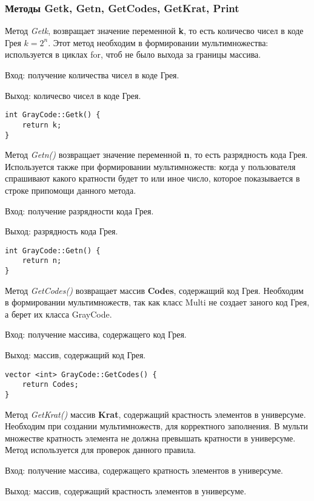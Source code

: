\documentclass[10pt,a4paper,final]{article} %
\begin{document}
	
\subsubsection {Методы Getk, Getn, GetCodes, GetKrat, Print}

\par Метод \textit{Getk}, возвращает значение переменной \textbf{k}, то есть количесво чисел в коде Грея $k=2^n$. Этот метод необходим в формировании мультимножества: используется в циклах for, чтоб не было выхода за границы массива.
\par Вход: получение количества чисел в коде Грея.
\par Выход: количесво чисел в коде Грея.\\

\begin{lstlisting}[caption={Метод Getk}]
int GrayCode::Getk() {
	return k;
}
\end{lstlisting}



\par Метод \textit{ Getn()} возвращает значение переменной \textbf{n}, то есть разрядность кода Грея. Используется также при формировании мультимножеств: когда у пользователя спрашивают какого кратности будет то или иное число, которое показывается в строке припомощи данного метода.
\par Вход: получение разрядности кода Грея.
\par Выход: разрядность кода Грея.

\begin{lstlisting}[caption={Метод Getn}]
int GrayCode::Getn() {
	return n;
}
\end{lstlisting}



\par Метод \textit{ GetCodes()} возвращает массив \textbf{Codes}, содержащий код Грея. Необходим в формировании мультимножеств, так как класс Multi не создает заного код Грея, а берет их класса GrayCode.
\par Вход: получение массива, содержащего код Грея.
\par Выход: массив, содержащий код Грея.

\begin{lstlisting}[caption={Метод GetCodes}]
vector <int> GrayCode::GetCodes() {
	return Codes;
}
\end{lstlisting}




\par Метод \textit{ GetKrat()} массив \textbf{Krat}, содержащий крастность элементов в универсуме. Необходим при создании мультимножеств, для корректного заполнения. В мульти множестве кратность элемента не должна превышать кратности в универсуме. Метод используется для проверок данного правила. 
\par Вход: получение массива, содержащего кратность элементов в универсуме.
\par Выход: массив, содержащий крастность элементов в универсуме.
\end{document}
